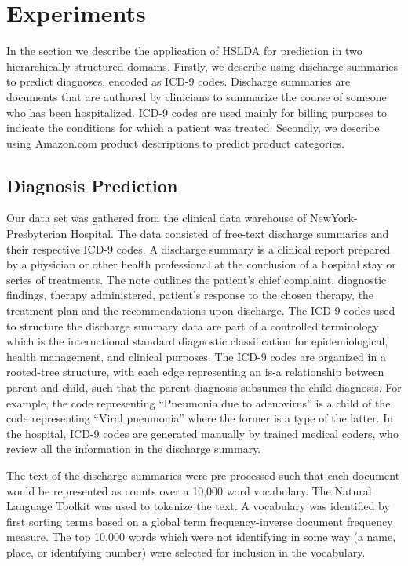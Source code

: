 \documentclass{article}
\begin{document}
\section{Experiments}

In the section we describe the application of HSLDA for prediction
in two hierarchically structured domains. Firstly, we describe using
discharge summaries to predict diagnoses, encoded as ICD-9 codes.
Discharge summaries are documents that are authored by clinicians
to summarize the course of someone who has been hospitalized. ICD-9
codes are used mainly for billing purposes to indicate the conditions
for which a patient was treated. Secondly, we describe using Amazon.com
product descriptions to predict product categories.


\subsection{Diagnosis Prediction}

Our data set was gathered from the clinical data warehouse of NewYork-Presbyterian
Hospital. The data consisted of free-text discharge summaries and
their respective ICD-9 codes. A discharge summary is a clinical report
prepared by a physician or other health professional at the conclusion
of a hospital stay or series of treatments. The note outlines the
patient's chief complaint, diagnostic findings, therapy administered,
patient's response to the chosen therapy, the treatment plan and the
recommendations upon discharge. The ICD-9 codes used to structure
the discharge summary data are part of a controlled terminology which
is the international standard diagnostic classification for epidemiological,
health management, and clinical purposes. The ICD-9 codes are organized
in a rooted-tree structure, with each edge representing an is-a relationship
between parent and child, such that the parent diagnosis subsumes
the child diagnosis. For example, the code representing {}``Pneumonia
due to adenovirus'' is a child of the code representing {}``Viral
pneumonia'' where the former is a type of the latter. In the hospital,
ICD-9 codes are generated manually by trained medical coders, who
review all the information in the discharge summary.

The text of the discharge summaries were pre-processed such that each
document would be represented as counts over a 10,000 word vocabulary.
The Natural Language Toolkit was used to tokenize the text. A vocabulary
was identified by first sorting terms based on a global term frequency-inverse
document frequency measure. The top 10,000 words which were not identifying
in some way (a name, place, or identifying number) were selected for
inclusion in the vocabulary.
\end{document}
